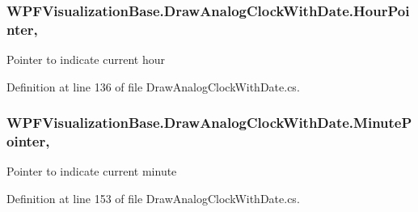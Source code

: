 \subsubsection[{\texorpdfstring{Hour\+Pointer}{HourPointer}}]{ W\+P\+F\+Visualization\+Base.\+Draw\+Analog\+Clock\+With\+Date.\+Hour\+Pointer\hspace{0.3cm}{\ttfamily [get]}, {\ttfamily [protected]}}\hypertarget{class_w_p_f_visualization_base_1_1_draw_analog_clock_with_date_a3e46eed172aeea22d919fc0119537088}{}\label{class_w_p_f_visualization_base_1_1_draw_analog_clock_with_date_a3e46eed172aeea22d919fc0119537088}


Pointer to indicate current hour 



Definition at line 136 of file Draw\+Analog\+Clock\+With\+Date.\+cs.

\subsubsection[{\texorpdfstring{Minute\+Pointer}{MinutePointer}}]{ W\+P\+F\+Visualization\+Base.\+Draw\+Analog\+Clock\+With\+Date.\+Minute\+Pointer\hspace{0.3cm}{\ttfamily [get]}, {\ttfamily [protected]}}\hypertarget{class_w_p_f_visualization_base_1_1_draw_analog_clock_with_date_a746828f3b40ca1f1289e5cc5cffa2053}{}\label{class_w_p_f_visualization_base_1_1_draw_analog_clock_with_date_a746828f3b40ca1f1289e5cc5cffa2053}


Pointer to indicate current minute 



Definition at line 153 of file Draw\+Analog\+Clock\+With\+Date.\+cs.

